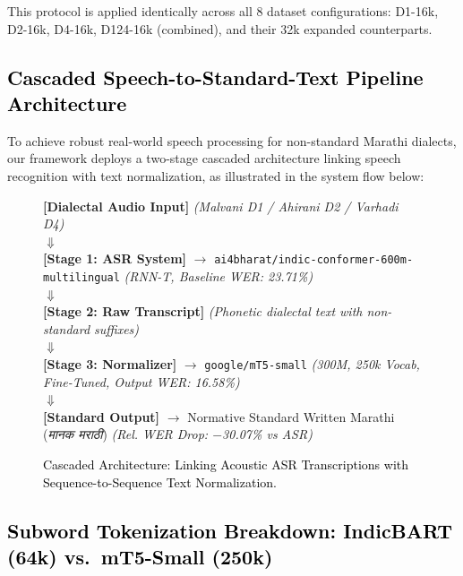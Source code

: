 This protocol is applied identically across all 8 dataset configurations: D1-16k, D2-16k, D4-16k, D124-16k (combined), and their 32k expanded counterparts.

\subsection{\textcolor{black}{Cascaded Speech-to-Standard-Text Pipeline Architecture}}

To achieve robust real-world speech processing for non-standard Marathi dialects, our framework deploys a two-stage cascaded architecture linking speech recognition with text normalization, as illustrated in the system flow below:

\begin{figure}[h!]
\centering
\begin{small}
\begin{tcolorbox}[colback=blue!5!white,colframe=blue!75!black,title=\textbf{CASCADED SPEECH-TO-TEXT NORMALIZATION PIPELINE}]
\centering
\textbf{[Dialectal Audio Input]} \textit{(Malvani D1 / Ahirani D2 / Varhadi D4)}\\[4pt]
$\Downarrow$\\[4pt]
\textbf{[Stage 1: ASR System]} $\longrightarrow$ \texttt{ai4bharat/indic-conformer-600m-multilingual} \textit{(RNN-T, Baseline WER: 23.71\%)}\\[4pt]
$\Downarrow$\\[4pt]
\textbf{[Stage 2: Raw Transcript]} \textit{(Phonetic dialectal text with non-standard suffixes)}\\[4pt]
$\Downarrow$\\[4pt]
\textbf{[Stage 3: Normalizer]} $\longrightarrow$ \texttt{google/mT5-small} \textit{(300M, 250k Vocab, Fine-Tuned, Output WER: 16.58\%)}\\[4pt]
$\Downarrow$\\[4pt]
\textbf{[Standard Output]} $\longrightarrow$ Normative Standard Written Marathi (\emph{मानक मराठी}) \textit{(Rel. WER Drop: $-$30.07\% vs ASR)}
\end{tcolorbox}
\end{small}
\caption{\textcolor{black}{Cascaded Architecture: Linking Acoustic ASR Transcriptions with Sequence-to-Sequence Text Normalization.}}
\label{fig:cascaded_architecture}
\end{figure}

\subsection{\textcolor{black}{Subword Tokenization Breakdown: IndicBART (64k) vs.\ mT5-Small (250k)}}

